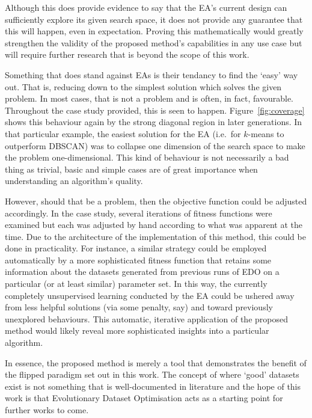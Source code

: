 \documentclass[smallextended]{svjour3}
\begin{document}
Although this does provide evidence to say that the EA's current design can
sufficiently explore its given search space, it does not provide any guarantee
that this will happen, even in expectation. Proving this mathematically would
greatly strengthen the validity of the proposed method's capabilities in any use
case but will require further research that is beyond the scope of this work.

Something that does stand against EAs is their tendancy to find the `easy' way
out. That is, reducing down to the simplest solution which solves the given
problem. In most cases, that is not a problem and is often, in fact, favourable.
Throughout the case study provided, this is seen to happen.
Figure~\ref{fig:coverage} shows this behaviour again by the strong diagonal
region in later generations. In that particular example, the easiest solution
for the EA (i.e.\ for \(k\)-means to outperform DBSCAN) was to collapse one
dimension of the search space to make the problem one-dimensional. This kind of
behaviour is not necessarily a bad thing as trivial, basic and simple cases are
of great importance when understanding an algorithm's quality.

However, should that be a problem, then the objective function could be adjusted
accordingly. In the case study, several iterations of fitness functions were
examined but each was adjusted by hand according to what was apparent at the
time. Due to the architecture of the implementation of this method, this could
be done in practicality. For instance, a similar strategy could be employed
automatically by a more sophisticated fitness function that retains some
information about the datasets generated from previous runs of EDO on a
particular (or at least similar) parameter set. In this way, the currently
completely unsupervised learning conducted by the EA could be ushered away from
less helpful solutions (via some penalty, say) and toward previously unexplored
behaviours. This automatic, iterative application of the proposed method would
likely reveal more sophisticated insights into a particular algorithm.

In essence, the proposed method is merely a tool that demonstrates the benefit
of the flipped paradigm set out in this work. The concept of where `good'
datasets exist is not something that is well-documented in literature and the
hope of this work is that Evolutionary Dataset Optimisation acts as a starting
point for further works to come.


\end{document}
